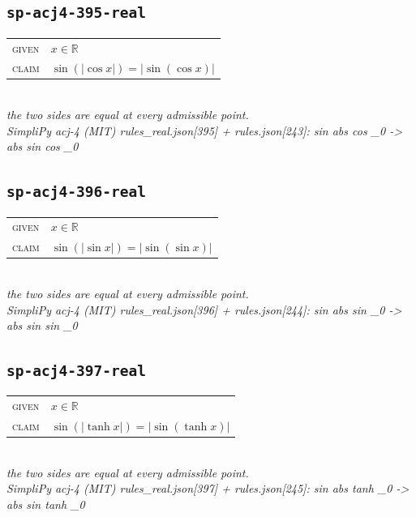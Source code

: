 \documentclass[11pt]{article}
\begin{document}
\subsection*{\texttt{sp-acj4-395-real}}
\begin{tabular}{@{}l@{\quad}l@{}}
\textsc{given} & $x \in \mathbb{R}$ \\[4pt]
\textsc{claim} & $\displaystyle \sin\left(\left|\cos x\right|\right) = \left|\sin\left(\cos x\right)\right|$ \\
\end{tabular}\\[2pt]
{\small\emph{the two sides are equal at every admissible point.}}\\
\emph{SimpliPy acj-4 (MIT) rules\_real.json[395] + rules.json[243]: sin abs cos \_0  ->  abs sin cos \_0}\\

\subsection*{\texttt{sp-acj4-396-real}}
\begin{tabular}{@{}l@{\quad}l@{}}
\textsc{given} & $x \in \mathbb{R}$ \\[4pt]
\textsc{claim} & $\displaystyle \sin\left(\left|\sin x\right|\right) = \left|\sin\left(\sin x\right)\right|$ \\
\end{tabular}\\[2pt]
{\small\emph{the two sides are equal at every admissible point.}}\\
\emph{SimpliPy acj-4 (MIT) rules\_real.json[396] + rules.json[244]: sin abs sin \_0  ->  abs sin sin \_0}\\

\subsection*{\texttt{sp-acj4-397-real}}
\begin{tabular}{@{}l@{\quad}l@{}}
\textsc{given} & $x \in \mathbb{R}$ \\[4pt]
\textsc{claim} & $\displaystyle \sin\left(\left|\tanh x\right|\right) = \left|\sin\left(\tanh x\right)\right|$ \\
\end{tabular}\\[2pt]
{\small\emph{the two sides are equal at every admissible point.}}\\
\emph{SimpliPy acj-4 (MIT) rules\_real.json[397] + rules.json[245]: sin abs tanh \_0  ->  abs sin tanh \_0}\\
\end{document}
